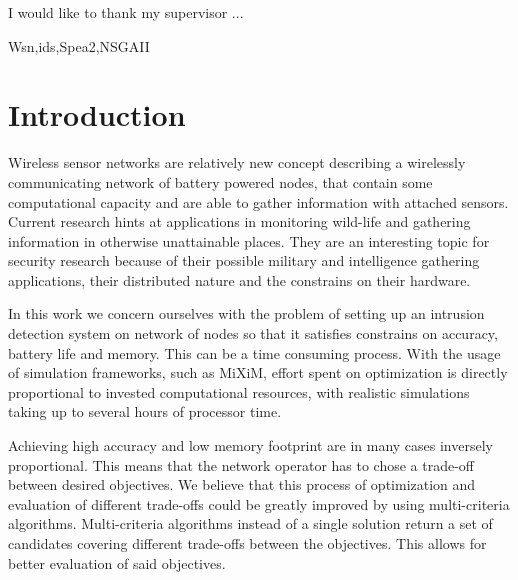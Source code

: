 \documentclass[12pt,oneside]{fithesis2}
\begin{document}
\FrontMatter
\ThesisTitlePage
\begin{ThesisDeclaration}
\DeclarationText
\AdvisorName
\end{ThesisDeclaration}
\begin{ThesisThanks}
I would like to thank my supervisor ...
\end{ThesisThanks}
\begin{ThesisAbstract}
\end{ThesisAbstract}
 
\begin{ThesisKeyWords}
Wsn,ids,Spea2,NSGAII
\end{ThesisKeyWords}

\tableofcontents %

\MainMatter
\chapter{Introduction}
\label{chap:intro}
Wireless sensor networks are relatively new concept describing a wirelessly communicating network of battery powered nodes, that contain some computational capacity and are able to gather information with attached sensors. Current research hints at applications in monitoring wild-life and gathering information in otherwise unattainable places. They are an interesting topic for security research because of their possible military and intelligence gathering applications, their distributed nature and the constrains on their hardware. 

In this work we concern ourselves with the problem of setting up an intrusion detection system on network of nodes so that it satisfies constrains on accuracy, battery life and memory. This can be a time consuming process. With the usage of simulation frameworks, such as MiXiM, effort spent on optimization is directly proportional to invested computational resources, with realistic simulations taking up to several hours of processor time.

Achieving high accuracy and low memory footprint are in many cases inversely proportional. This means that the network operator has to chose a trade-off between desired objectives.  We believe that this process of optimization and evaluation of different trade-offs could be greatly improved by using multi-criteria algorithms. Multi-criteria algorithms instead of a single solution return a set of candidates covering different trade-offs between the objectives. This allows for better evaluation of said objectives.
\end{document}
